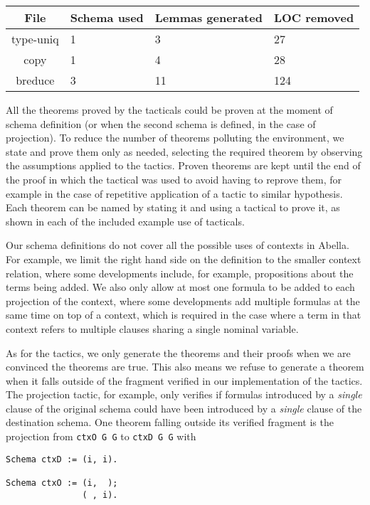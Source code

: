 \documentclass[nocopyrightspace,authoryear]{sigplanconf}
\begin{document}
\begin{center}
\begin{tabular} { | c || p{1.5cm} | p{1.5cm} | p{1.5cm} |}
\hline
File & Schema used & Lemmas generated & LOC removed \\ \hline
type-uniq & 1 & 3 & 27  \\ \hline
copy & 1 & 4 & 28 \\ \hline
breduce & 3 & 11 & 124 \\ \hline

\end{tabular}
\end{center}

All the theorems proved by the tacticals could be proven at the moment of schema definition (or when the second schema is defined, in the case of projection). To reduce the number of theorems polluting the environment, we state and prove them only as needed, selecting the required theorem by observing the assumptions applied to the tactics. Proven theorems are kept until the end of the proof in which the tactical was used to avoid having to reprove them, for example in the case of repetitive application of a tactic to similar hypothesis. Each theorem can be named by stating it and using a tactical to prove it, as shown in each of the included example use of tacticals.

Our schema definitions do not cover all the possible uses of contexts in Abella. 
For example, we limit the right hand side on the definition to the smaller context relation, where some developments include, for example, propositions about the terms being added. We also only allow at most one formula to be added to each projection of the context, where some developments add multiple formulas at the same time on top of a context, which is required in the case where a term in that context refers to multiple clauses sharing a single nominal variable. %
 
As for the tactics, we only generate the theorems and their proofs when we are convinced the theorems are true. This also means we refuse to generate a theorem when it falls outside of the fragment verified in our implementation of the tactics. The projection tactic, for example, only verifies if formulas introduced by a \emph{single} clause of the original schema could have been introduced by a \emph{single} clause of the destination schema. One theorem falling outside its verified fragment is the projection from \lstinline|ctxO G G| to  \lstinline|ctxD G G| with
\begin{lstlisting}
Schema ctxD := (i, i).

Schema ctxO := (i,  );
               ( , i).
\end{lstlisting}
\end{document}
